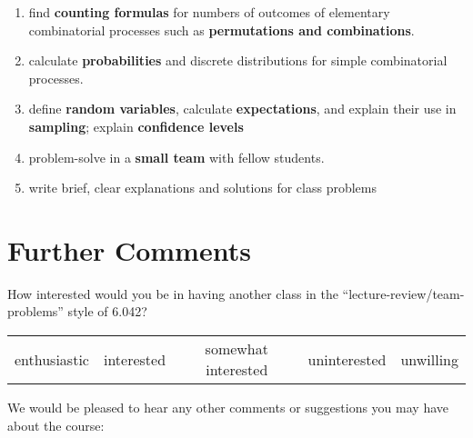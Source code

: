 \documentclass[handout]{mcs}
\begin{document}
\begin{enumerate}
\item \label{counting} find \textbf{counting formulas} for numbers of
  outcomes of elementary combinatorial processes such as
  \textbf{permutations and combinations}. \hfill \brule{0.5in}

\iffalse
\item\label{generating functions} use \textbf{generating functions} to solve
  linear recurrences and elementary counting problems.
  \hfill \brule{0.5in}
\fi

\item \label{probability} calculate \textbf{probabilities} and
  discrete distributions for simple combinatorial processes.  \hfill \brule{0.5in}

\item \label{random_variables} define \textbf{random variables},
  calculate \textbf{expectations}, and explain their use
  in \textbf{sampling}; explain \textbf{confidence levels} \hfill
  \brule{0.5in}

\item \label{student teams} problem-solve in a \textbf{small team} with
fellow students.  \hfill \brule{0.5in}

\item \label{writing} write brief, clear explanations and solutions for
  class problems \hfill \brule{0.5in}
\end{enumerate}

\newpage
\section*{Further Comments}

How interested would you be in having another class in the
``lecture-review/team-problems'' style of 6.042?
\begin{center}
\begin{tabular}{ccccc}
enthusiastic &  interested &  somewhat interested  &  uninterested &  unwilling
\end{tabular}
\end{center}

\vspace{0.5in}
We would be pleased to hear any other comments or suggestions you may have
about the course:

\textbox{\hspace{7in}
\vspace{6in}}
\end{document}

